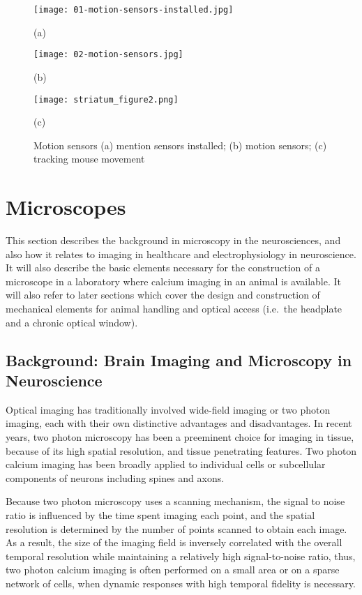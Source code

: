 \documentclass[../main.tex]{subfiles}
\begin{document}
\begin{figure}[htb]
	\begin{minipage}[t]{0.45\linewidth}\centering
		\texttt{[image: 01-motion-sensors-installed.jpg]}
		\centerline{(a)}
	\end{minipage}
	\hfill
	\begin{minipage}[t]{0.45\linewidth}\centering
		\texttt{[image: 02-motion-sensors.jpg]}
		\centerline{(b)}
	\end{minipage}
	\begin{minipage}[t]{\linewidth}\centering
		\texttt{[image: striatum\_figure2.png]}
		\centerline{(c)}
	\end{minipage}
	\caption{
		Motion sensors (a) mention sensors installed;
		(b) motion sensors; (c) tracking mouse movement}
	\label{fig:motion sensors}
\end{figure}

\section{Microscopes}\label{sec:microscopes}

This section describes the background in microscopy in the neurosciences, and also how it relates to imaging in healthcare and electrophysiology in neuroscience.
It will also describe the basic elements necessary for the construction of a microscope in a laboratory where calcium imaging in an animal is available.
It will also refer to later sections which cover the design and construction of mechanical elements for animal handling and optical access (i.e.~the headplate and a chronic optical window).

\subsection{Background: Brain Imaging and Microscopy in Neuroscience}\label{sec:background-brain-imaging-and-microscopy-in-neuroscience}

Optical imaging has traditionally involved wide-field imaging or two photon imaging, each with their own distinctive advantages and disadvantages.
In recent years, two photon microscopy has been a preeminent choice for imaging in tissue, because of its high spatial resolution, and tissue penetrating features.
Two photon calcium imaging has been broadly applied to individual cells or subcellular components of neurons including spines and axons.

Because two photon microscopy uses a scanning mechanism, the signal to noise ratio is influenced by the time spent imaging each point, and the spatial resolution is determined by the number of points scanned to obtain each image.
As a result, the size of the imaging field is inversely correlated with the overall temporal resolution while maintaining a relatively high signal-to-noise ratio, thus, two photon calcium imaging is often performed on a small area or on a sparse network of cells, when dynamic responses with high temporal fidelity is necessary.
\end{document}
